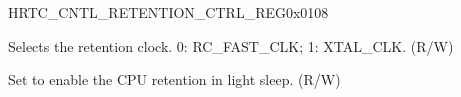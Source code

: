 \begin{register}{H}{RTC\_CNTL\_RETENTION\_CTRL\_REG}{0x0108}\label{regdesc:RTCCNTLRETENTIONCTRLREG}
%
%
%
%
%
%
\regnewline%
\begin{regdesc}\begin{reglist}
\label{fielddesc:RTCCNTLRETENTIONCLKSEL}\item [RTC\_CNTL\_RETENTION\_CLK\_SEL] Selects the retention clock. 0: RC\_FAST\_CLK; 1: XTAL\_CLK. (R/W)
\label{fielddesc:RTCCNTLRETENTIONEN}\item [RTC\_CNTL\_RETENTION\_EN] Set to enable the CPU retention in light sleep. (R/W)
\end{reglist}\end{regdesc}
\end{register}

